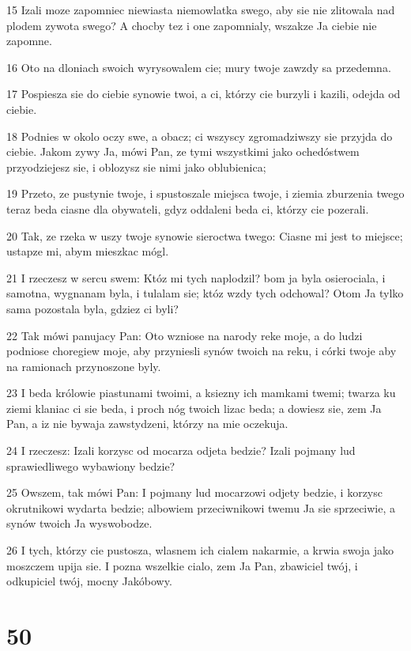 \par 15 Izali moze zapomniec niewiasta niemowlatka swego, aby sie nie zlitowala nad plodem zywota swego? A chocby tez i one zapomnialy, wszakze Ja ciebie nie zapomne.
\par 16 Oto na dloniach swoich wyrysowalem cie; mury twoje zawzdy sa przedemna.
\par 17 Pospiesza sie do ciebie synowie twoi, a ci, którzy cie burzyli i kazili, odejda od ciebie.
\par 18 Podnies w okolo oczy swe, a obacz; ci wszyscy zgromadziwszy sie przyjda do ciebie. Jakom zywy Ja, mówi Pan, ze tymi wszystkimi jako ochedóstwem przyodziejesz sie, i oblozysz sie nimi jako oblubienica;
\par 19 Przeto, ze pustynie twoje, i spustoszale miejsca twoje, i ziemia zburzenia twego teraz beda ciasne dla obywateli, gdyz oddaleni beda ci, którzy cie pozerali.
\par 20 Tak, ze rzeka w uszy twoje synowie sieroctwa twego: Ciasne mi jest to miejsce; ustapze mi, abym mieszkac mógl.
\par 21 I rzeczesz w sercu swem: Któz mi tych naplodzil? bom ja byla osierociala, i samotna, wygnanam byla, i tulalam sie; któz wzdy tych odchowal? Otom Ja tylko sama pozostala byla, gdziez ci byli?
\par 22 Tak mówi panujacy Pan: Oto wzniose na narody reke moje, a do ludzi podniose choregiew moje, aby przyniesli synów twoich na reku, i córki twoje aby na ramionach przynoszone byly.
\par 23 I beda królowie piastunami twoimi, a ksiezny ich mamkami twemi; twarza ku ziemi klaniac ci sie beda, i proch nóg twoich lizac beda; a dowiesz sie, zem Ja Pan, a iz nie bywaja zawstydzeni, którzy na mie oczekuja.
\par 24 I rzeczesz: Izali korzysc od mocarza odjeta bedzie? Izali pojmany lud sprawiedliwego wybawiony bedzie?
\par 25 Owszem, tak mówi Pan: I pojmany lud mocarzowi odjety bedzie, i korzysc okrutnikowi wydarta bedzie; albowiem przeciwnikowi twemu Ja sie sprzeciwie, a synów twoich Ja wyswobodze.
\par 26 I tych, którzy cie pustosza, wlasnem ich cialem nakarmie, a krwia swoja jako moszczem upija sie. I pozna wszelkie cialo, zem Ja Pan, zbawiciel twój, i odkupiciel twój, mocny Jakóbowy.

\chapter{50}

